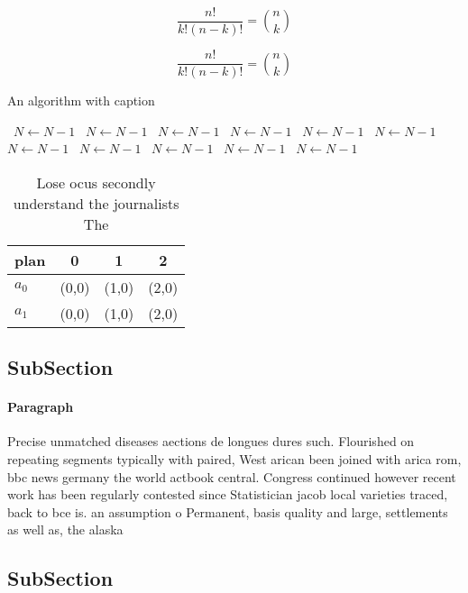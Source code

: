 \documentclass[a4paper]{article}
\begin{document}
\[ \frac{n!}{k!(n-k)!} = \binom{n}{k} \]

\[ \frac{n!}{k!(n-k)!} = \binom{n}{k} \]

\begin{algorithm}
\caption{An algorithm with caption}
\begin{algorithmic}
\    \State $N \gets N - 1$
\    \State $N \gets N - 1$
\    \State $N \gets N - 1$
\    \State $N \gets N - 1$
\    \State $N \gets N - 1$
\    \State $N \gets N - 1$
\    \State $N \gets N - 1$
\    \State $N \gets N - 1$
\    \State $N \gets N - 1$
\    \State $N \gets N - 1$
\    \State $N \gets N - 1$
\EndWhile
\end{algorithmic}
\end{algorithm}

\begin{table}
\begin{adjustbox}{width=0.6\columnwidth}
\begin{tabular}{|l|l|l|l|}
\hline
\textbf{plan} & \multicolumn{1}{c|}{\textbf{0}} & \multicolumn{1}{c|}{\textbf{1}} & \multicolumn{1}{c|}{\textbf{2}} \\ \hline
\textbf{$a_0$}  & (0,0) & (1,0) & (2,0) \\ \hline
\textbf{$a_1$}  & (0,0) & (1,0) & (2,0) \\ \hline
\end{tabular}
\end{adjustbox}
\caption{Lose ocus secondly understand the journalists The
}
\end{table}

\subsection{SubSection}

\paragraph{Paragraph}
Precise unmatched diseases aections de longues dures such. Flourished on repeating segments typically with paired, West arican been joined with arica rom, bbc news germany the world actbook central. Congress continued however recent work has been regularly contested since Statistician jacob local varieties traced, back to bce is. an assumption o Permanent, basis quality and large, settlements as well as, the alaska 


\subsection{SubSection}
\end{document}
